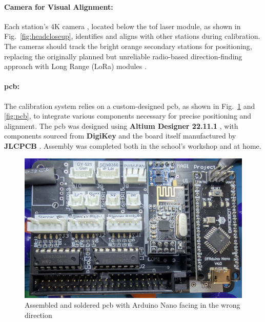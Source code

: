 \paragraph{Camera for Visual Alignment:}
Each station’s 4K camera \cite{armsom_camera_module}, located below the \acrshort{tof} laser module, as shown in Fig.~\ref{fig:headcloseup}, identifies and aligns with other stations during calibration. The cameras should track the bright orange secondary stations for positioning, replacing the originally planned but unreliable radio-based direction-finding approach with Long Range (LoRa) modules \cite{tecnoio_lora_modules}.

\paragraph{\acrshort{pcb}:}
The calibration system relies on a custom-designed \acrshort{pcb}, as shown in Fig.~\ref{fig:solderedpcb} and \ref{fig:pcb}, to integrate various components necessary for precise positioning and alignment. The \acrshort{pcb} was designed using \textbf{Altium Designer 22.11.1} \cite{altium_designer_22}, with components sourced from \textbf{DigiKey} \cite{digikey} and the board itself manufactured by \textbf{JLCPCB} \cite{jlcpcb}. Assembly was completed both in the school’s workshop and at home.

\begin{figure}[H]
	\centering
	\includegraphics[width=1.0\linewidth]{figures/soldered_pcb}
	\caption{Assembled and soldered \acrshort{pcb} with Arduino Nano \cite{arduino_nano_dfrobot} facing in the wrong direction}
	\label{fig:solderedpcb}
\end{figure}


